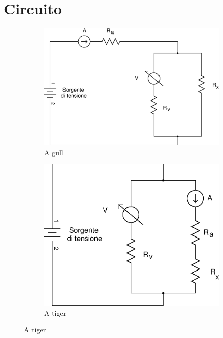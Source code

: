 \section*{Circuito}

\begin{figure}[h]
  \centering
  \begin{subfigure}[b]{0.5\textwidth}
    \includegraphics{monte.eps}
    \caption{A gull}
    \label{fig:monte}
  \end{subfigure}
  \begin{subfigure}[b]{0.5\textwidth}
    \includegraphics{valle.eps}
    \caption{A tiger}
    \label{fig:valle}
  \end{subfigure}
\end{figure}
